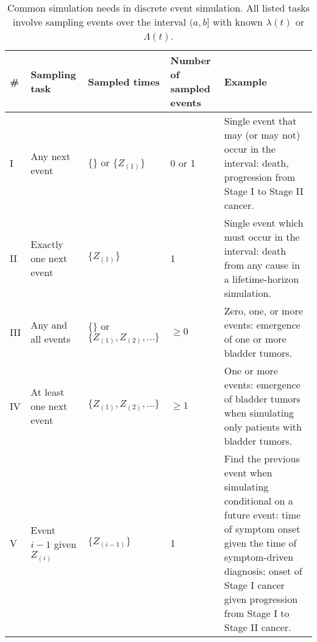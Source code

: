 \begin{table}[h!]
    \centering
    \begin{tabular}{lp{2cm}lp{1.8cm}p{6cm}}
    \toprule
    \textbf{\#} & \textbf{Sampling task} & \textbf{Sampled times} & \textbf{Number of sampled events} & \textbf{Example}  \\ 
    \midrule
    I & Any next event&  $\{\}$  or $\{Z_{(1)}\}$&  0 or 1& Single event that may (or may not) occur in the interval: death, progression from Stage I to Stage II cancer. \\ 
    \addlinespace
    II & Exactly one next event&  $\{Z_{(1)} \}$&  1& Single event which must occur in the interval: death from any cause in a lifetime-horizon simulation. \\ 
    \addlinespace
    III & Any and all events&  $\{\}$ or $\{Z_{(1)}, Z_{(2)}, \dots \}$&  $\ge 0$& Zero, one, or more events: emergence of one or more bladder tumors. \\ 
    \addlinespace
    IV & At least one next event&  $\{Z_{(1)} , Z_{(2)}, \dots \}$&  $\ge 1$& One or more events: emergence of bladder tumors when simulating only patients with bladder tumors. \\ 
    \addlinespace
    V & Event $i-1$ given $Z_{(i)}$ & $\{Z_{(i-1)}\}$ & 1 & Find the previous event when simulating conditional on a future event: time of symptom onset given the time of symptom-driven diagnosis; onset of Stage I cancer given progression from Stage I to Stage II cancer. \\ 
    \bottomrule
    \end{tabular}
    \caption{Common simulation needs in discrete event simulation. All listed tasks involve sampling events over the interval $(a, b]$ with known $\lambda(t)$ or $\Lambda(t)$.}
    \label{tab:simtasks}
\end{table}
